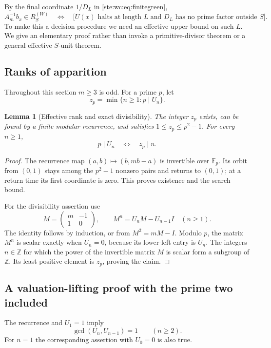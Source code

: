 \documentclass[11pt,letterpaper]{article}
\newtheorem{lemma}[theorem]{Lemma}
\theoremstyle{definition}
\theoremstyle{remark}
\newcommand{\Z}{\mathbb Z}
\newcommand{\F}{\mathbb F}
\begin{document}
By the final coordinate $1/D_L$ in \eqref{ste:wc:eq:finitegreen},
\begin{equation}\label{ste:wc:eq:localcriterion}
 A_m^{-1}b_x\in R_S^{(W)}
 \quad\Longleftrightarrow\quad
 \bigl[U(x)\text{ halts at length }L
 \text{ and }D_L\text{ has no prime factor outside }S\bigr].
\end{equation}
To make this a decision procedure we need an effective upper bound on
such $L$. We give an elementary proof rather than invoke a primitive-divisor
theorem or a general effective $S$-unit theorem.

\subsection{Ranks of apparition}
Throughout this section $m\geq3$ is odd. For a prime $p$, let
\begin{equation}\label{ste:wc:eq:rank}
 z_p=\min\{n\geq1:p\mid U_n\}.
\end{equation}

\begin{lemma}[Effective rank and exact divisibility]\label{ste:wc:lem:rank}
The integer $z_p$ exists, can be found by a finite modular recurrence, and
satisfies $1\leq z_p\leq p^2-1$. For every $n\geq1$,
\[
 p\mid U_n\quad\Longleftrightarrow\quad z_p\mid n.
\]
\end{lemma}
\begin{proof}
The recurrence map $(a,b)\mapsto(b,mb-a)$ is invertible over $\F_p$. Its
orbit from $(0,1)$ stays among the $p^2-1$ nonzero pairs and returns to
$(0,1)$; at a return time its first coordinate is zero. This proves existence
and the search bound.

For the divisibility assertion use
\begin{equation}\label{ste:wc:eq:matrixLucas}
 M=\begin{pmatrix}m&-1\\1&0\end{pmatrix},\qquad
 M^n=U_nM-U_{n-1}I\quad(n\geq1).
\end{equation}
The identity follows by induction, or from $M^2=mM-I$. Modulo $p$, the
matrix $M^n$ is scalar exactly when $U_n=0$, because its lower-left entry
is $U_n$. The integers $n\in\Z$ for which the power of the invertible
matrix $M$ is scalar form a subgroup of $\Z$. Its least positive element
is $z_p$, proving the claim.
\end{proof}

\subsection{A valuation-lifting proof with the prime two included}
The recurrence and $U_1=1$ imply
\begin{equation}\label{ste:wc:eq:coprimeU}
 \gcd(U_n,U_{n-1})=1\qquad(n\geq2).
\end{equation}
For $n=1$ the corresponding assertion with $U_0=0$ is also true.
\end{document}
